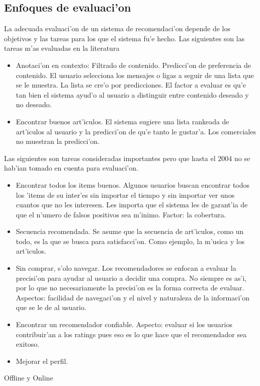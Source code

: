 \documentclass[11pt]{article}
\begin{document}
\subsection{Enfoques de evaluaci'on}
La adecuada evaluaci'on de un sistema de recomendaci'on depende de los objetivos y las tareas para los que el sistema fu'e hecho. Las siguientes son las tareas m'as evaluadas en la literatura
\begin{itemize}
\item Anotaci'on en contexto: Filtrado de contenido. Predicci'on de preferencia de contenido. El usuario selecciona los mensajes o ligas a seguir de una lista que se le muestra. La lista se cre'o por predicciones. El factor a evaluar es qu'e tan bien el sistema ayud'o al usuario a distinguir entre contenido deseado y no deseado.
\item Encontrar buenos art'iculos. El sistema sugiere una lista rankeada de art'iculos al usuario y la predicci'on de qu'e tanto le gustar'a. Los comerciales no muestran la predicci'on.
\end{itemize}

Las siguientes son tareas consideradas importantes pero que hasta el 2004 no se hab'ian tomado en cuenta para evaluaci'on.

\begin{itemize}
\item Encontrar todos los items buenos. Algunos usuarios buscan encontrar todos los 'items de su inter'es sin importar el tiempo y sin importar ver unos cuantos que no les interesen. Les importa que el sistema les de garant'ia de que el n'umero de falsos positivos sea m'inimo. Factor: la cobertura.
\item Secuencia recomendada. Se asume que la secuencia de art'iculos, como un todo, es la que se busca para satisfacci'on. Como ejemplo, la m'usica y los art'iculos.
\item Sin comprar, s'olo navegar. Los recomendadores se enfocan a evaluar la precisi'on para ayudar al usuario a decidir una compra. No siempre es as'i, por lo que no necesariamente la precisi'on es la forma correcta de evaluar. Aspectos: facilidad de navegaci'on y el nivel y naturaleza de la informaci'on que se le de al usuario.
\item Encontrar un recomendador confiable. Aspecto: evaluar si los usuarios contribuir'an a los ratings pues eso es lo que hace que el recomendador sea exitoso.
\item Mejorar el perfil.
\end{itemize}
Offline y Online
\end{document}

